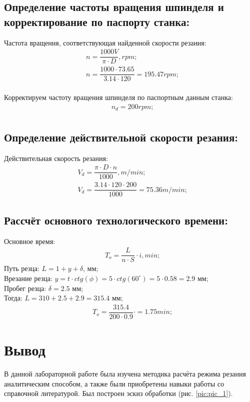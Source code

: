 \newpage

\subsection{Определение частоты вращения шпинделя и корректирование по паспорту станка:}
Частота вращения, соответствующая найденной скорости резания:
\begin{equation}
	\begin{split}
		&n=\dfrac{1000V}{\pi \cdot D}, rpm;\\
		&n=\dfrac{1000\cdot 73.65}{3.14\cdot 120}=195.47 rpm;\\
	\end{split}
\end{equation}

Корректируем частоту вращения шпинделя по паспортным данным станка:
\begin{equation}
	\begin{split}
		&n_d = 200 rpm;\\
	\end{split}
\end{equation}

\subsection{Определение действительной скорости резания:}
Действительная скорость резания:
\begin{equation}
	\begin{split}
		&V_d = \dfrac{\pi\cdot D\cdot n}{1000}, m/min;\\
		&V_d = \dfrac{3.14\cdot 120\cdot 200}{1000} =75.36 m/min;
	\end{split}
\end{equation}

\subsection{Рассчёт основного технологического времени:}
Основное время:
\begin{equation}
	\begin{split}
		&T_o = \dfrac{L}{n\cdot S}\cdot i, min;
	\end{split}
\end{equation}
Путь резца: $L=1+y+\delta$,  мм;\\
Врезание резца: $y=t\cdot ctg(\phi) = 5\cdot ctg(60^{\circ}) = 5\cdot 0.58 = 2.9$ мм;\\
Пробег резца: $\delta = 2.5$ мм;\\
Тогда: $L=310 + 2.5 + 2.9 = 315.4$ мм;\\
\begin{equation}
	\begin{split}
		&T_o = \dfrac{315.4}{200\cdot 0.9}\cdot = 1.75 min;
	\end{split}
\end{equation}

\section{Вывод}
В данной лабораторной работе была изучена методика расчёта режима резания аналитическим способом, а также были приобретены навыки работы со справочной литературой. Был построен эскиз обработки (рис. \ref{pic:pic_1}).


